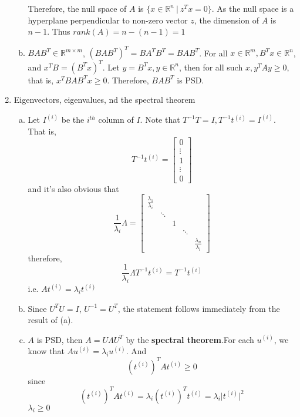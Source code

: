 \documentclass[11pt]{article}
\providecommand{\abs}[1]{\lvert#1\rvert}
\newcommand{\bbR}{{\mathbb R}}
\begin{document}
\begin{enumerate}[1.]
\begin{enumerate}[(a)]
    Therefore, the null space of $A$ is $\{x \in \mathbb{R}^n\ \vert\  z^Tx = 0
    \}$. As the null space is a hyperplane perpendicular to non-zero vector $z$,
    the dimension of $A$ is $n-1$. Thus $rank(A)=n - (n-1) = 1$
  \item $BAB^T \in \bbR^{m\times m}$, $(BAB^T)^T = BA^TB^T= BAB^T$. For all $x
    \in \bbR^m, B^Tx \in \bbR^n$, and $x^TB = (B^Tx)^T$. Let $y = B^Tx, y \in
    \bbR^n$, then for all such $x, y^TAy \geq 0$, that is, $x^TBAB^Tx \geq 0$.
    Therefore, $BAB^T$ is PSD.
  \end{enumerate}
  
\item Eigenvectors, eigenvalues, nd the spectral theorem
  \begin{enumerate}[(a)]
  \item Let $I^{(i)}$ be the $i^{th}$ column of $I$. Note that $T^{-1}T = I,
    T^{-1}t^{(i)} = I^{(i)}$. That is,
    \[
      T^{-1}t^{(i)} =
      \begin{bmatrix}
        0 \\
        \vdots \\
        1\\
        \vdots \\
        0
      \end{bmatrix}
    \]
    and it's also obvious that
    \[
      \frac{1}{\lambda_i}\Lambda =
      \begin{bmatrix}
        \frac{\lambda_1}{\lambda_i} & & & & \\
        & \ddots & & & \\
        & & 1 & & \\
        & &   & \ddots & \\
        & & & & \frac{\lambda_n}{\lambda_i}
      \end{bmatrix}
    \]
    therefore,
    \[
      \frac{1}{\lambda_i}\Lambda T^{-1}t^{(i)} = T^{-1}t^{(i)}
    \]
    i.e. $At^{(i)} = \lambda_it^{(i)}$

  \item Since $U^TU = I$, $U^{-1} = U^T$, the statement follows immediately from
    the result of (a).
  \item $A$ is PSD, then $A = U\Lambda U^T$ by the \textbf{spectral theorem}.For each $u^{(i)}$, we know that $Au^{(i)} = \lambda_iu^{(i)}$. And
    \begin{equation*}
      \label{eq:1}
       (t^{(i)})^TAt^{(i)} \geq 0
     \end{equation*}
     since
     \[
       (t^{(i)})^TAt^{(i)} = \lambda_i(t^{(i)})^Tt^{(i)} = \lambda_i\abs{t^{(i)}}^2
     \]
      $\lambda_i \geq 0$
  \end{enumerate}
\end{enumerate}
\end{document}
